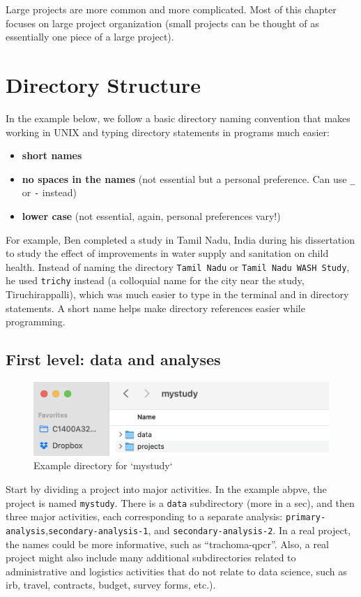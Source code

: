 \documentclass[
]{book}
\providecommand{\tightlist}{%
  \setlength{\itemsep}{0pt}\setlength{\parskip}{0pt}}
\begin{document}
Large projects are more common and more complicated. Most of this chapter focuses on large project organization (small projects can be thought of as essentially one piece of a large project).

\section{Directory Structure}\label{directory-structure}

In the example below, we follow a basic directory naming convention that makes working in UNIX and typing directory statements in programs much easier:

\begin{itemize}
\tightlist
\item
  \textbf{short names}
\item
  \textbf{no spaces in the names} (not essential but a personal preference. Can use \texttt{\_} or \texttt{-} instead)
\item
  \textbf{lower case} (not essential, again, personal preferences vary!)
\end{itemize}

For example, Ben completed a study in Tamil Nadu, India during his dissertation to study the effect of improvements in water supply and sanitation on child health. Instead of naming the directory \texttt{Tamil\ Nadu} or \texttt{Tamil\ Nadu\ WASH\ Study}, he used \texttt{trichy} instead (a colloquial name for the city near the study, Tiruchirappalli), which was much easier to type in the terminal and in directory statements. A short name helps make directory references easier while programming.

\subsection{First level: data and analyses}\label{first-level-data-and-analyses}

\begin{figure}
\includegraphics[width=0.75\linewidth]{images/mystudy-dir-fig1} \caption{Example directory for `mystudy`}\label{fig:dir-fig1}
\end{figure}

Start by dividing a project into major activities. In the example abpve, the project is named \texttt{mystudy}. There is a \texttt{data} subdirectory (more in a sec), and then three major activities, each corresponding to a separate analysis: \texttt{primary-analysis},\texttt{secondary-analysis-1}, and \texttt{secondary-analysis-2}. In a real project, the names could be more informative, such as ``trachoma-qpcr''. Also, a real project might also include many additional subdirectories related to administrative and logistics activities that do not relate to data science, such as irb, travel, contracts, budget, survey forms, etc.).
\end{document}
